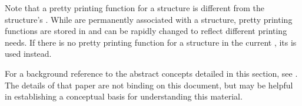 Note that a pretty printing function for a structure is different from
the structure's  .
While
 
are permanently associated with a structure,
pretty printing functions are stored in 
 and can be rapidly changed to reflect 
different printing needs.  If there is no pretty printing function for 
a structure in the current ,
its  
is used instead.

\endsubSection%


For a background reference to the abstract concepts detailed in this
section, see \XPPaper.  The details of that paper are not binding on
this document, but may be helpful in establishing a conceptual basis for
understanding this material.

\endsubsection%

